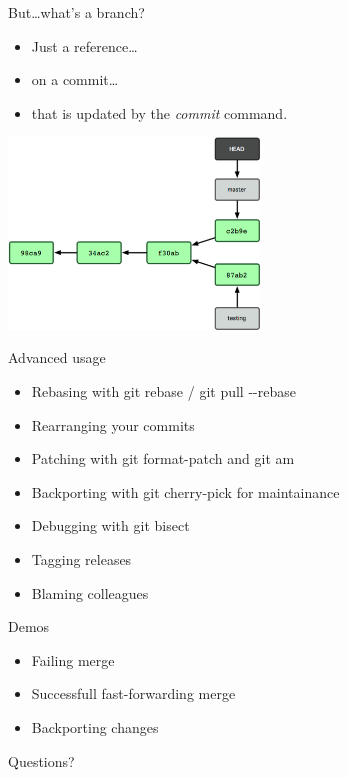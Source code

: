 \documentclass{beamer}
\begin{document}
\begin{frame}{But\dots what's a branch?}
   \begin{itemize}
      \item Just a reference\dots\pause
      \item on a commit\dots\pause
      \item that is updated by the \emph{commit} command.
   \end{itemize}
   \begin{center}
   \includegraphics[width=0.5\textwidth]{branches-inside.png}
   \end{center}
\end{frame}

\begin{frame}{Advanced usage}
    \begin{itemize}
        \item Rebasing with git rebase / git pull -{}-rebase
        \pause
        \item Rearranging your commits
        \pause
        \item Patching with git format-patch and git am
        \pause
        \item Backporting with git cherry-pick for maintainance
        \pause
        \item Debugging with git bisect
        \pause
        \item Tagging releases
        \pause
        \item Blaming colleagues
    \end{itemize}
\end{frame}

\begin{frame}{Demos}
   \begin{itemize}
      \item Failing merge
      \pause
      \item Successfull fast-forwarding merge
      \pause
      \item Backporting changes
   \end{itemize}
\end{frame}

\begin{frame}{Questions?}
\end{frame}
\end{document}
